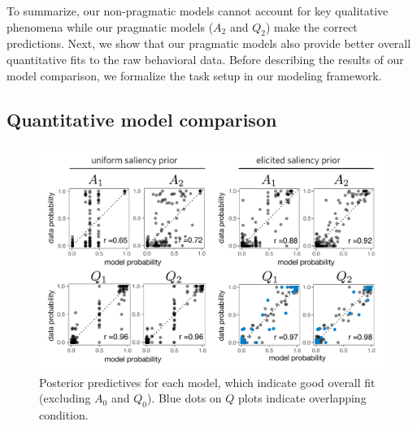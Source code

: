 \documentclass[12pt, floatsintext, jou]{apa6}
\begin{document}

To summarize, our non-pragmatic models cannot account for key qualitative phenomena while our pragmatic models ($A_2$ and $Q_2$) make the correct predictions. 
Next, we show that our pragmatic models also provide better overall quantitative fits to the raw behavioral data. 
Before describing the results of our model comparison, we formalize the task setup in our modeling framework. 

\subsection{Quantitative model comparison}

\begin{figure}[tbh!]
\begin{center}
\includegraphics[scale = .77]{Exp1/ResultsFig.pdf}
\end{center}
\caption{Posterior predictives for each model, which indicate good overall fit (excluding $A_0$ and $Q_0$). Blue dots on $Q$ plots indicate overlapping condition.}
\label{fig:exp1predictives}
\end{figure}
\end{document}
